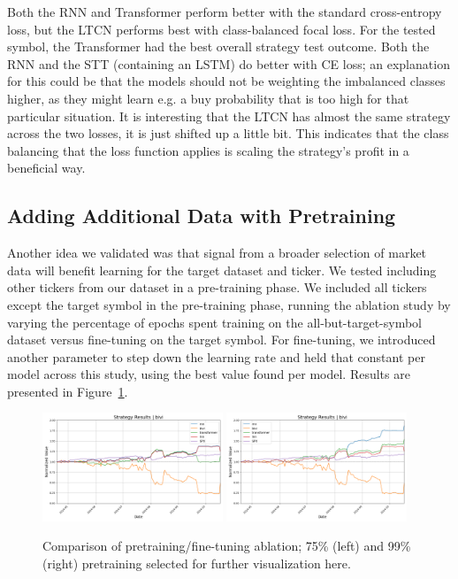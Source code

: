 \documentclass[10pt,twocolumn,letterpaper]{article}
\begin{document}
Both the RNN and Transformer perform better with the standard cross-entropy loss, but the LTCN performs best with class-balanced focal loss. For the tested symbol, the Transformer had the best overall strategy test outcome. Both the RNN and the STT (containing an LSTM) do better with CE loss; an explanation for this could be that the models should not be weighting the imbalanced classes higher, as they might learn e.g. a buy probability that is too high for that particular situation. It is interesting that the LTCN has almost the same strategy across the two losses, it is just shifted up a little bit. This indicates that the class balancing that the loss function applies is scaling the strategy's profit in a beneficial way.

\subsection{Adding Additional Data with Pretraining}

Another idea we validated was that signal from a broader selection of market data will benefit learning for the target dataset and ticker. We tested including other tickers from our dataset in a pre-training phase. We included all tickers except the target symbol in the pre-training phase, running the ablation study by varying the percentage of epochs spent training on the all-but-target-symbol dataset versus fine-tuning on the target symbol. For fine-tuning, we introduced another parameter to step down the learning rate and held that constant per model across this study, using the best value found per model.  Results are presented in Figure~\ref{fig:pretrainingsplits}.

\begin{figure}[ht!]
    \centering
    \includegraphics[width=0.48\textwidth]{../figures/simulation_results_all_models_bivi_config_target_split_75_regenerated_anarasimham.yml.png}
    \includegraphics[width=0.48\textwidth]{../figures/simulation_results_all_models_bivi_config_target_split_99.yml.png} 
    \caption{Comparison of pretraining/fine-tuning ablation; 75\% (left) and 99\% (right) pretraining selected for further visualization here.}
    \label{fig:pretrainingsplits}
\end{figure}
\end{document}
